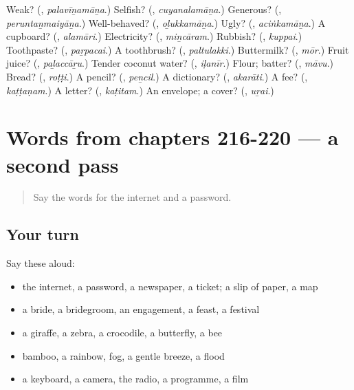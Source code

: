 \begin{tcolorbox}[breakable,colback=teal!4,colframe=teal!35!black,title={Before you move on}]
Weak? (\textbf{}, \emph{palavīṉamāṉa}.) Selfish? (\textbf{}, \emph{cuyanalamāṉa}.) Generous? (\textbf{}, \emph{peruntaṉmaiyāṉa}.) Well-behaved? (\textbf{}, \emph{oḻukkamāṉa}.) Ugly? (\textbf{}, \emph{aciṅkamāṉa}.) A cupboard? (\textbf{}, \emph{alamāri}.) Electricity? (\textbf{}, \emph{miṉcāram}.) Rubbish? (\textbf{}, \emph{kuppai}.) Toothpaste? (\textbf{}, \emph{paṟpacai}.) A toothbrush? (\textbf{}, \emph{paltulakki}.) Buttermilk? (\textbf{}, \emph{mōr}.) Fruit juice? (\textbf{}, \emph{paḻaccāṟu}.) Tender coconut water? (\textbf{}, \emph{iḷanīr}.) Flour; batter? (\textbf{}, \emph{māvu}.) Bread? (\textbf{}, \emph{roṭṭi}.) A pencil? (\textbf{}, \emph{peṉcil}.) A dictionary? (\textbf{}, \emph{akarāti}.) A fee? (\textbf{}, \emph{kaṭṭaṇam}.) A letter? (\textbf{}, \emph{kaṭitam}.) An envelope; a cover? (\textbf{}, \emph{uṟai}.)
\end{tcolorbox}
\section[(dialogue)]{Words from chapters 216-220 — a second pass}

\label{lesson:TA-R220-second-pass-words-from-chapters-216-220}



\begin{quote}
Say the words for the internet and a password.
\end{quote}

\subsection*{Your turn}
Say these aloud:

\begin{itemize}
\raggedright
  \item the internet, a password, a newspaper, a ticket; a slip of paper, a map
  \item a bride, a bridegroom, an engagement, a feast, a festival
  \item a giraffe, a zebra, a crocodile, a butterfly, a bee
  \item bamboo, a rainbow, fog, a gentle breeze, a flood
  \item a keyboard, a camera, the radio, a programme, a film
\end{itemize}

